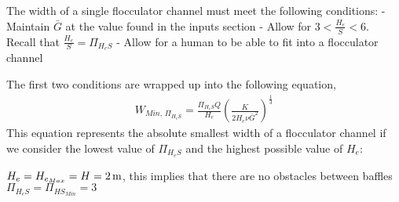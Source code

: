 \documentclass[letterpaper,10pt,english]{sphinxmanual}
\begin{document}
\section{}
\label{\detokenize{Flocculation/Floc_Design:width-and-number-of-channels}}
The width of a single flocculator channel must meet the following conditions:
- Maintain \(\bar G\) at the value found in the inputs section
- Allow for \(3 < \frac{H_e}{S} < 6\). Recall that \(\frac{H_e}{S} =  \Pi_{H_eS}\)
- Allow for a human to be able to fit into a flocculator channel

The first two conditions are wrapped up into the following equation, {\hyperref[\detokenize{Flocculation/Floc_Derivations:title-flocculation-derivations}]{}}
\begin{equation}\label{equation:Flocculation/Floc_Design:Flocculation/Floc_Design:20}
\begin{split}W_{Min, \, \Pi_{H_eS}} = \frac{\Pi_{H_eS}Q}{H_e}\left( \frac{K}{2 H_e \nu \bar G^2} \right)^\frac{1}{3}\end{split}
\end{equation}
This equation represents the absolute smallest width of a flocculator channel if we consider the lowest value of \(\Pi_{H_eS}\) and the highest possible value of \(H_e\):

\(H_e = H_{e_{Max}} = H = 2 \, {\rm m}\), this implies that there are no obstacles between baffles
\(\Pi_{H_eS} = \Pi_{ {HS}_{Min} } = 3\)
\end{document}
